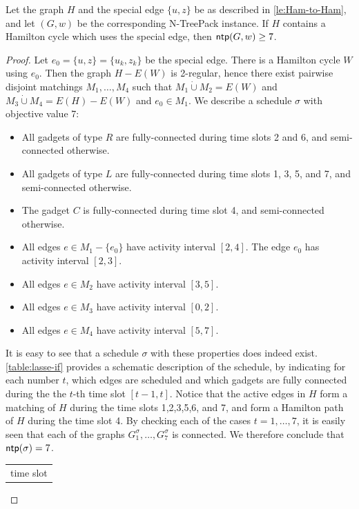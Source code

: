 \documentclass[runningheads]{llncs}
\newcommand{\set}[1]{\{ #1 \}}
\newcommand{\dotunion}{\mathbin{\dot{\cup}}}
\newcommand{\xxxNTP}{{\sc N-TreePack}}
\DeclareMathOperator{\ntp}{\text{\sf ntp}}
\begin{document}
\begin{lemma}
\label{lemma:lasse-if}
Let the graph $H$ and the special edge $\set{u,z}$ be as described in \cref{le:Ham-to-Ham}, and let $(G, w)$ be the corresponding {\xxxNTP} instance. 
If $H$ contains a Hamilton cycle which uses the special edge, then $\ntp(G, w) \geq 7$.
\end{lemma}
\begin{proof}
Let $e_0 = \set{u, z} = \set{u_k, z_k}$ be the special edge. There is a Hamilton cycle $W$ using $e_0$. Then the graph $H-E(W)$ is 2-regular, hence there exist pairwise disjoint matchings $M_1, \ldots, M_4$ such that $M_1 \dotunion M_2 = E(W)$ and $M_3 \dotunion M_4 = E(H) - E(W)$ and $e_0 \in M_1$. We describe a schedule $\sigma$ with objective value 7:
\begin{itemize}
\item All gadgets of type $R$ are fully-connected during time slots 2 and 6, and semi-connected otherwise.
\item All gadgets of type $L$ are fully-connected during time slots 1, 3, 5, and 7, and semi-connected otherwise.
\item The gadget $C$ is fully-connected during time slot 4, and semi-connected otherwise.
\item All edges $e \in M_1 - \set{e_0}$ have activity interval $[2, 4]$. The edge $e_0$ has activity interval $[2, 3]$.
\item All edges $e \in M_2$ have activity interval $[3, 5]$.
\item All edges $e \in M_3$ have activity interval $[0, 2]$.
\item All edges $e \in M_4$ have activity interval $[5, 7]$.
\end{itemize}
It is easy to see that a schedule $\sigma$ with these properties does indeed exist. \cref{table:lasse-if} provides a schematic description of the schedule, by indicating for each number $t$, which edges are scheduled and which gadgets are fully connected during the the $t$-th time slot $[t-1, t]$.  Notice that the active edges in $H$ form a matching of $H$ during the time slots 1,2,3,5,6, and 7, 
and form a Hamilton path of $H$ during the time slot 4. 
By checking each of the cases $t=1,\dots,7$, it is easily seen that each of the graphs $G^\sigma_1,\ldots,G^\sigma_7$ is connected. We therefore conclude that $\ntp(\sigma) = 7$. 
\begin{table}[htpb]
\centering
 \begin{tabular}{ c | c | c | c | c | c | c } 
 \multicolumn{7}{c}{time slot}\\

\end{tabular}
\end{table}
\end{proof}
\end{document}
